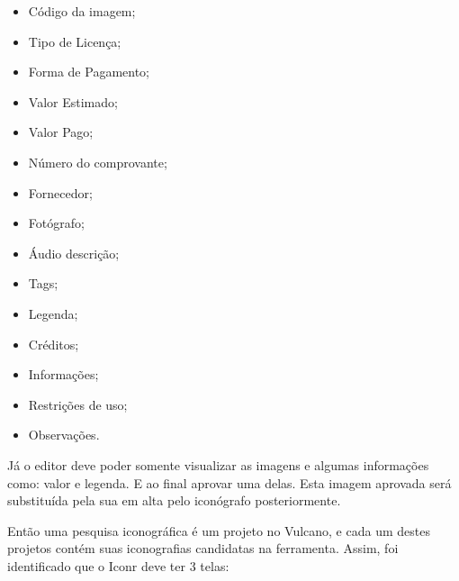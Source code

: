 \documentclass[
  12pt,            %
  openany,
  oneside,
  a4paper,         %
  english,      %
  brazil
]{article}
\numberwithin{figure}{section}
\numberwithin{table}{section}
\begin{document}
\vspace{-10mm}
\begin{singlespace}
  \begin{itemize}
    \item Código da imagem;
    \item Tipo de Licença;
    \item Forma de Pagamento;
    \item Valor Estimado;
    \item Valor Pago;
    \item Número do comprovante;
    \item Fornecedor;
    \item Fotógrafo;
    \item Áudio descrição;
    \item Tags;
    \item Legenda;
    \item Créditos;
    \item Informações;
    \item Restrições de uso;
    \item Observações.
  \end{itemize}
\end{singlespace}
\vspace{-5mm}

Já o editor deve poder somente visualizar as imagens e algumas informações como: valor e legenda. E ao final aprovar uma delas. Esta imagem aprovada será substituída pela sua em alta pelo iconógrafo posteriormente.

Então uma pesquisa iconográfica é um projeto no Vulcano, e cada um destes projetos contém suas iconografias candidatas na ferramenta. Assim, foi identificado que o Iconr deve ter 3 telas:
\end{document}
